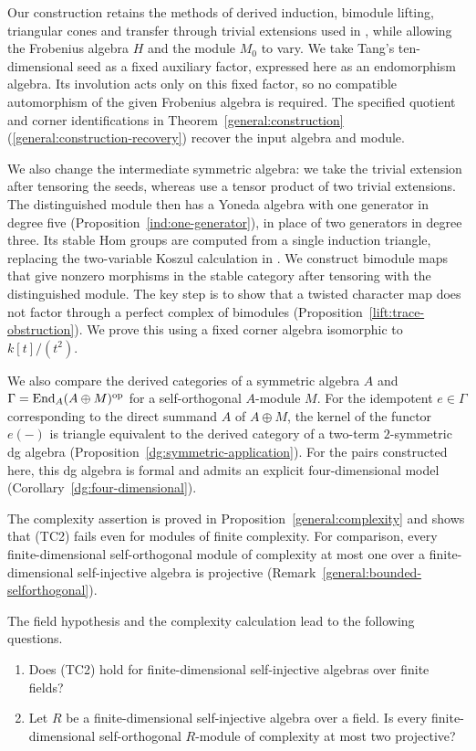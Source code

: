 \documentclass[11pt]{article}
\begin{document}
Our construction retains the methods of derived induction, bimodule
lifting, triangular cones and transfer through trivial extensions
used in \cite{O,F}, while allowing the Frobenius algebra $H$ and
the module $M_0$ to vary. We take Tang's ten-dimensional seed as a
fixed auxiliary factor, expressed here as an endomorphism algebra.
Its involution acts only on this fixed factor, so no compatible
automorphism of the given Frobenius algebra is required.
The specified quotient and corner identifications in
Theorem~\ref{general:construction}\textup{(\ref{general:construction-recovery})} recover the input
algebra and module.

We also change the intermediate symmetric algebra: we take the
trivial extension after tensoring the seeds, whereas \cite{O,F}
use a tensor product of two trivial extensions. The distinguished
module then has a Yoneda algebra with one generator in degree five
(Proposition~\ref{ind:one-generator}), in place of two generators
in degree three. Its stable Hom groups are computed from a single
induction triangle, replacing the two-variable Koszul calculation
in \cite{O,F}. We construct bimodule maps that give nonzero
morphisms in the stable category after tensoring with the
distinguished module. The key step is to show that a twisted
character map does not factor through a perfect complex of
bimodules (Proposition~\ref{lift:trace-obstruction}). We prove this
using a fixed corner algebra isomorphic to $k[t]/(t^2)$.

We also compare the derived categories of a symmetric algebra $A$
and $\Gamma={\rm End}_A(A\oplus M)^{\mathrm{op}}$ for a self-orthogonal
$A$-module $M$. For the idempotent $e\in\Gamma$ corresponding to
the direct summand $A$ of $A\oplus M$, the kernel of the functor $e(-)$ is triangle equivalent to the derived category of a two-term
$2$-symmetric dg algebra
(Proposition~\ref{dg:symmetric-application}). For the pairs
constructed here, this dg algebra is formal and admits an explicit
four-dimensional model (Corollary~\ref{dg:four-dimensional}).

The complexity assertion is proved in Proposition~\ref{general:complexity}
and shows that (TC2) fails even for modules of finite complexity. For comparison,
every finite-dimensional self-orthogonal module of complexity at most
one over a finite-dimensional self-injective algebra is projective
(Remark~\ref{general:bounded-selforthogonal}).

The field hypothesis and the complexity calculation lead to the
following questions.
\begin{enumerate}
\item
Does (TC2) hold for finite-dimensional self-injective algebras over
finite fields?
\item
Let $R$ be a finite-dimensional self-injective algebra over a field.
Is every finite-dimensional self-orthogonal $R$-module of complexity
at most two projective?
\end{enumerate}
\end{document}
